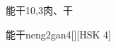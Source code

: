 \begin{entry}{能干}{10,3}{⾁、⼲}
  \begin{phonetics}{能干}{neng2gan4}[][HSK 4]
  \end{phonetics}
\end{entry}
